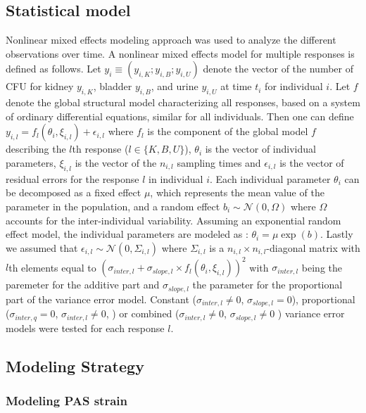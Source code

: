 \documentclass{article}
\begin{document}
\subsection{Statistical model}

Nonlinear mixed effects modeling approach was used to analyze the different observations over time. A nonlinear mixed effects model for multiple responses is defined as follows. Let $y_i \equiv (y_{i,K}; y_{i,B}; y_{i,U})$ denote the vector of the number of CFU for kidney $y_{i,K}$, bladder $y_{i,B}$, and urine $y_{i,U}$ at time $t_i$ for individual $i$.
Let $f$ denote the global structural model characterizing all responses, based on a system of ordinary differential equations, similar for all individuals.
Then one can define $ y_{i,l} = f_{l}(\theta_i, \xi_{i,l} ) + \epsilon_{i,l} $ where $f_{l}$ is the component of the global model $f$ describing the $l$th response ($l \in \{K,B,U\}$), $\theta_i$ is the vector of individual parameters, $\xi_{i,l}$ is the vector of the $n_{i,l}$ sampling times and $\epsilon_{i,l}$ is the vector of residual errors for the  response $l$ in individual $i$. Each individual parameter $\theta_i$ can be decomposed as a fixed effect $\mu$, which represents the mean value of the parameter in the population, and a random effect $b_i \sim \mathcal{N}(0, \Omega)$ where $\Omega$ accounts for the inter-individual variability. Assuming an exponential random effect model, the individual parameters are modeled as : $\theta_i = \mu \exp(b)$.
Lastly we assumed that $\epsilon_{i,l} \sim \mathcal{N} (0, \Sigma_{i,l})$ where $\Sigma_{i,l}$ is a $ n_{i,l} \times n_{i,l}$-diagonal matrix with $l$th elements equal to $(\sigma_{inter,l} + \sigma_{slope,l}\times f_{l}(\theta_i, \xi_{i,l}))^2$ with $\sigma_{inter, l}$ being the paremeter for the additive part and $\sigma_{slope,l}$ the parameter for the proportional part of the variance error model. Constant ($\sigma_{inter, l} \neq 0$, $\sigma_{slope, l} = 0$), proportional ($\sigma_{inter, q} = 0$, $\sigma_{inter, l} \neq 0$, ) or combined ($\sigma_{inter, l} \neq 0$, $\sigma_{slope, l} \neq 0$ ) variance error models were tested for each response $l$.





\subsection{Modeling Strategy}


\subsubsection{Modeling PAS strain}
\end{document}
